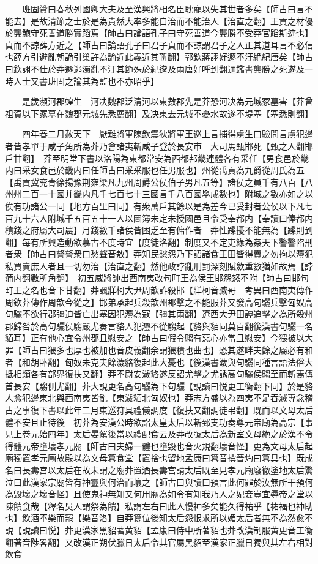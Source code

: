 　　班固贊曰春秋列國卿大夫及至漢興將相名臣耽寵以失其世者多矣【師古曰言不能去】是故清節之士於是為貴然大率多能自治而不能治人【治直之翻】王貢之材優於龔鮑守死善道勝實蹈焉【師古曰論語孔子曰守死善道今龔勝不受莽官蹈斯迹也】貞而不諒薛方近之【師古曰論語孔子曰君子貞而不諒謂君子之人正其道耳言不必信也薛方引避亂朝詭引巢許為諭近此義近其靳翻】郭欽蔣詡好遯不汙絶紀唐矣【師古曰欽詡不仕於莽遯逃濁亂不汙其節殊於紀逡及兩唐好呼到翻通鑑書龔勝之死遂及一時人士又書班固之論其為監也不亦昭乎】

　　是歲瀕河郡蝗生　河决魏郡泛清河以東數郡先是莽恐河决為元城冢墓害【莽曾祖賀以下冢墓在魏郡元城先悉薦翻】及决東去元城不憂水故遂不堤塞【塞悉則翻】

　　四年春二月赦天下　厭難將軍陳欽震狄將軍王巡上言捕得虜生口驗問言虜犯邊者皆孝單于咸子角所為莽乃會諸夷斬咸子登於長安市　大司馬甄邯死【甄之人翻邯戶甘翻】　莽至明堂下書以洛陽為東都常安為西都邦畿連體各有采任【男食邑於畿内曰采女食邑於畿内曰任師古曰采采服也任男服也】州從禹貢為九爵從周氏為五【禹貢冀兖青徐揚豫荆雍梁凡九州周爵公侯伯子男凡五等】諸侯之員千有八百【八州州二百一十國并畿内凡千七百七十三國言千八百國舉成數也】附城之數亦如之以俟有功諸公一同【地方百里曰同】有衆萬戶其餘以是為差今已受封者公侯以下凡七百九十六人附城千五百五十一人以圖簿未定未授國邑且令受奉都内【奉讀曰俸都内積錢之府屬大司農】月錢數千諸侯皆困乏至有傭作者　莽性躁擾不能無為【躁則到翻】每有所興造動欲慕古不度時宜【度徒洛翻】制度又不定吏緣為姦天下謷謷陷刑者衆【師古曰謷謷衆口愁聲音敖】莽知民愁怨乃下詔諸食王田皆得賣之勿拘以灋犯私買賣庶人者且一切勿治【治直之翻】然他政誖亂刑罰深刻賦歛重數猶如故焉【誖蒲内翻數所角翻】　初五威將帥出西南夷改句町王為侯王邯怨怒不附【師古曰邯句町王之名也音下甘翻】莽諷牂柯大尹周歆詐殺邯【牂柯音臧哥　考異曰西南夷傳作周欽莽傳作周歆今從之】邯弟承起兵殺歆州郡擊之不能服莽又發高句驪兵擊匈奴高句驪不欲行郡彊迫皆亡出塞因犯灋為寇【彊其兩翻】遼西大尹田譚追擊之為所殺州郡歸咎於高句驪侯騶嚴尤奏言貉人犯灋不從騶起【貉與貊同莫百翻後漢書句驪一名貊耳】正有他心宜令州郡且慰安之【師古曰假令騶有惡心亦當且慰安】今猥被以大罪【師古曰猥多也厚也被加也音皮義翻余謂猥積也曲也】恐其遂畔夫餘之屬必有和者【和胡卧翻】匈奴未克夫餘濊貉復起此大憂也【後漢書濊與句驪同種言語法俗大抵相類各有部界復扶又翻】莽不尉安濊貉遂反詔尤擊之尤誘高句驪侯騶至而斬焉傳首長安【騶側尤翻】莽大說更名高句驪為下句驪【說讀曰悦更工衡翻下同】於是貉人愈犯邊東北與西南夷皆亂【東濊貊北匈奴也】莽志方盛以為四夷不足吞滅專念稽古之事復下書以此年二月東巡狩具禮儀調度【復扶又翻調徒弔翻】既而以文母太后體不安且止待後　初莽為安漢公時欲諂太皇太后以斬郅支功奏尊元帝廟為高宗【事見上卷元始四年】太后晏駕後當以禮配食云及莽改號太后為新室文母絶之於漢不令得體元帝墮壞孝元廟【師古曰夫婦一體也墮毁也音火規翻壞音怪】更為文母太后起廟獨置孝元廟故殿以為文母篹食堂【置捨也留地孟康曰篹音撰晉灼曰篹具也】既成名曰長夀宫以太后在故未謂之廟莽置酒長夀宫請太后既至見孝元廟廢徹塗地太后驚泣曰此漢家宗廟皆有神靈與何治而壞之【師古曰與讀曰預言此何罪於汝無所干預何為毁壞之壞音怪】且使鬼神無知又何用廟為如令有知我乃人之妃妾豈宜辱帝之堂以陳饋食哉【釋名吳人謂祭為饋】私謂左右曰此人慢神多矣能久得祐乎【祐福也神助也】飲酒不樂而罷【樂音洛】自莽簒位後知太后怨恨求所以媚太后者無不為然愈不說【說讀曰悦】莽更漢家黑貂著黄貂【孟康曰侍中所著貂也莽改漢制服黄更音工衡翻著音陟畧翻】又改漢正朔伏臘日太后令其官屬黑貂至漢家正臘日獨與其左右相對飲食

